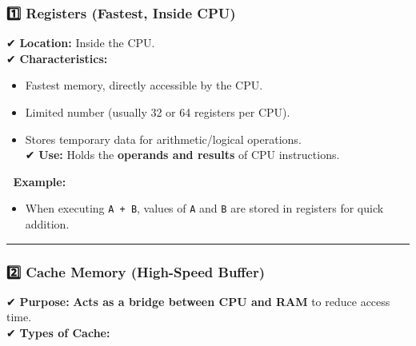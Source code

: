 \documentclass[
]{article}
\providecommand{\tightlist}{%
  \setlength{\itemsep}{0pt}\setlength{\parskip}{0pt}}
\begin{document}
\subsubsection{\texorpdfstring{\textbf{1️⃣ Registers} (Fastest, Inside
CPU)}{1️⃣ Registers (Fastest, Inside CPU)}}\label{registers-fastest-inside-cpu}

✔ \textbf{Location:} Inside the CPU.\\
✔ \textbf{Characteristics:}

\begin{itemize}
\tightlist
\item
  Fastest memory, directly accessible by the CPU.
\item
  Limited number (usually 32 or 64 registers per CPU).
\item
  Stores temporary data for arithmetic/logical operations.\\
  ✔ \textbf{Use:} Holds the \textbf{operands and results} of CPU
  instructions.
\end{itemize}

📌 \textbf{Example:}

\begin{itemize}
\tightlist
\item
  When executing \texttt{A\ +\ B}, values of \texttt{A} and \texttt{B}
  are stored in registers for quick addition.
\end{itemize}

\begin{center}\rule{0.5\linewidth}{0.5pt}\end{center}

\subsubsection{\texorpdfstring{\textbf{2️⃣ Cache Memory} (High-Speed
Buffer)}{2️⃣ Cache Memory (High-Speed Buffer)}}\label{cache-memory-high-speed-buffer}

✔ \textbf{Purpose:} \textbf{Acts as a bridge between CPU and RAM} to
reduce access time.\\
✔ \textbf{Types of Cache:}
\end{document}
